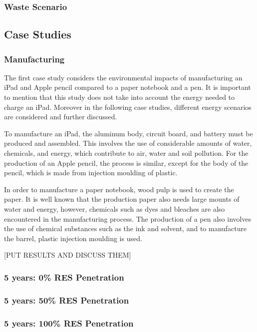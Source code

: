 \subsubsection*{Waste Scenario}

\subsection{Case Studies}\label{subsec:case_studies}

\subsubsection*{Manufacturing}
The first case study considers the environmental impacts of manufacturing an iPad and Apple pencil compared to a paper notebook and a pen. It is important to mention that this study does not take into account the energy needed to charge an iPad. Moreover in the following case studies, different energy scenarios are considered and further discussed. 

To manufacture an iPad, the aluminum body, circuit board, and battery must be produced and assembled. This involves the use of considerable amounts of water, chemicals, and energy, which contribute to air, water and soil pollution. For the production of an Apple pencil, the process is similar, except for the body of the pencil, which is made from injection moulding of plastic. 

In order to manufacture a paper notebook, wood pulp is used to create the paper. It is well known that the production paper also needs large mounts of water and energy, however, chemicals such as dyes and bleaches are also encountered in the manufacturing process. The production of a pen also involves the use of chemical substances such as the ink and solvent, and to manufacture the barrel, plastic injection moulding is used. 

[PUT RESULTS AND DISCUSS THEM]

\subsubsection*{5 years: 0\% RES Penetration}

\subsubsection*{5 years: 50\% RES Penetration}

\subsubsection*{5 years: 100\% RES Penetration}
